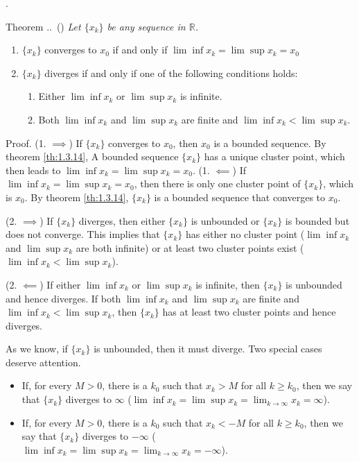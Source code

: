 \documentclass[8pt]{beamer}
\newcounter{thm}
\newcounter{ex}
\renewcommand{\thethm}{\thesection.\thesubsection.\arabic{thm}}
\renewenvironment{theorem}[1][]{%
    \refstepcounter{thm}%
    \begin{block}{Theorem \thethm\if\relax\detokenize{#1}\relax\else\ (#1)\fi}%
    \itshape
}{%
    \end{block}%
}
\newcommand{\mbb}[1]{\mathbb{#1}}
\begin{document}
\begin{frame}{.}
    \begin{theorem} \label{th:1.3.18}
        Let $\{x_k\}$ be any sequence in $\mbb{R}$.
        \begin{enumerate}
            \item $\{x_k\}$ converges to $x_0$ if and only if $\lim \inf x_k = \lim \sup x_k = x_0$
            \item $\{x_k\}$ diverges if and only if one of the following conditions holds:
            \begin{enumerate}
                \item Either $\lim \inf x_k$ or $\lim \sup x_k$ is infinite.
                \item Both $\lim \inf x_k$ and $\lim \sup x_k$ are finite and $\lim \inf x_k < \lim \sup x_k$.
            \end{enumerate}
        \end{enumerate}

        Proof. (1. $\implies$) If $\{x_k\}$ converges to $x_0$, then $x_0$ is a bounded sequence.
        By theorem \ref{th:1.3.14}, A bounded sequence $\{x_k\}$ has a unique cluster point, which then leads to $\lim \inf x_k = \lim \sup x_k = x_0$.
        (1. $\impliedby$) If $\lim \inf x_k = \lim \sup x_k = x_0$, then there is only one cluster point of $\{x_k\}$, which is $x_0$.
        By theorem \ref{th:1.3.14}, $\{x_k\}$ is a bounded sequence that converges to $x_0$.

        \smallskip
        (2. $\implies$) If $\{x_k\}$ diverges, then either $\{x_k\}$ is unbounded or $\{x_k\}$ is bounded but does not converge.
        This implies that $\{x_k\}$ has either no cluster point ($\lim \inf x_k$ and $\lim \sup x_k$ are both infinite) or at least two cluster points exist ($\lim \inf x_k < \lim \sup x_k$).

        (2. $\impliedby$) If either $\lim \inf x_k$ or $\lim \sup x_k$ is infinite, then $\{x_k\}$ is unbounded and hence diverges.
        If both $\lim \inf x_k$ and $\lim \sup x_k$ are finite and $\lim \inf x_k < \lim \sup x_k$, then $\{x_k\}$ has at least two cluster points and hence diverges.
    \end{theorem}

    \bigskip
    As we know, if $\{x_k\}$ is unbounded, then it must diverge.
    Two special cases deserve attention.
    \begin{itemize}
        \item If, for every $M > 0$, there is a $k_0$ such that $x_k >M$ for all $k \ge k_0$, then we say that $\{x_k\}$ diverges to $\infty$ ($\lim \inf x_k = \lim \sup x_k = \lim_{k \to \infty} x_k = \infty$).
        \item If, for every $M >0$, there is a $k_0$ such that $x_k < -M$ for all $k \ge k_0$, then we say that $\{x_k\}$ diverges to $-\infty$ ($\lim \inf x_k = \lim \sup x_k = \lim_{k \to \infty} x_k = -\infty$).
    \end{itemize}
\end{frame}
\end{document}
